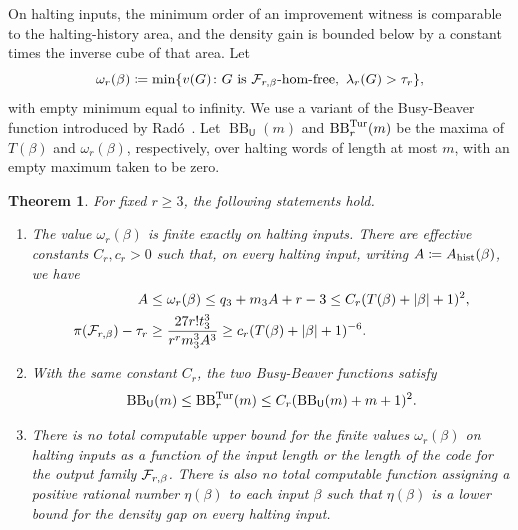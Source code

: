 \documentclass[10pt]{article}
\numberwithin{equation}{section}
\newtheorem{theorem}{Theorem}[section]
\theoremstyle{definition}
\newcommand{\BB}{\operatorname{BB}}
\begin{document}
On halting inputs, the minimum order of an improvement witness is comparable to the halting-history area, and the density gain is bounded below by a constant times the inverse cube of that area. Let
\[
 \omega_r(\beta)\coloneqq\min\{v(G)\colon G\text{ is }\mathcal F_{r,\beta}\text{-hom-free},\
                              \lambda_r(G)>\tau_r\},
\]
with empty minimum equal to infinity. We use a variant of the Busy-Beaver function introduced by Rad\'o~\cite{Rado1962}. Let $\BB_{\mathsf U}(m)$ and $\BB_r^{\rm Tur}(m)$ be the maxima of $T(\beta)$ and $\omega_r(\beta)$, respectively, over halting words of length at most $m$, with an empty maximum taken to be zero.
\begin{theorem}\label{thm:witnessbounds}
For fixed $r\ge3$, the following statements hold.
\begin{enumerate}[beginpenalty=10000]
\item The value $\omega_r(\beta)$ is finite exactly on halting inputs. There are effective constants $C_r,c_r>0$ such that, on every halting input, writing $A\coloneqq A_{\rm hist}(\beta)$, we have
\begin{align}
 A&\le\omega_r(\beta)\le q_3+m_3A+r-3
       \le C_r(T(\beta)+|\beta|+1)^2,\label{eq:witnessbounds}\\
 \pi(\mathcal F_{r,\beta})-\tau_r
       &\ge\frac{27r!t_3^3}{r^rm_3^3A^3}
        \ge c_r(T(\beta)+|\beta|+1)^{-6}.\label{eq:densitygap}
\end{align}
\item With the same constant $C_r$, the two Busy-Beaver functions satisfy
\[
 \BB_{\mathsf U}(m)\le\BB_r^{\rm Tur}(m)
       \le C_r(\BB_{\mathsf U}(m)+m+1)^2.
\]
\item There is no total computable upper bound for the finite values $\omega_r(\beta)$ on halting inputs as a function of the input length or the length of the code for the output family $\mathcal F_{r,\beta}$. There is also no total computable function assigning a positive rational number $\eta(\beta)$ to each input $\beta$ such that $\eta(\beta)$ is a lower bound for the density gap on every halting input.
\end{enumerate}
\end{theorem}
\end{document}
